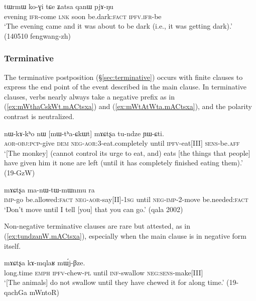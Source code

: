 \begin{exe}
\ex \label{ex:qanW.pjANu}
\gll  tɯrmɯ ko-ɣi tɕe ʑatsa qanɯ pjɤ-ŋu \\
evening \textsc{ifr}-come \textsc{lnk} soon be.dark:\textsc{fact} \textsc{ipfv}.\textsc{ifr}-be \\
\glt `The evening came and it was about to be dark (i.e., it was getting dark).' (140510 fengwang-zh)
\end{exe}

 \subsubsection{Terminative} \label{sec:terminative.clause}
The terminative postposition    (§\ref{sec:terminative}) occurs with finite clauses to express the end point of the event described in the main clause. In terminative clauses, verbs nearly always take a negative prefix as in (\ref{ex:mWthaCskWt.mACtsxa}) and (\ref{ex:mWtAtWta.mACtsxa}), and the polarity contrast is neutralized.

\begin{exe}
\ex \label{ex:mWthaCskWt.mACtsxa}
\gll nɯ-kɤ-kʰo nɯ [mɯ-tʰa-ɕkɯt] mɤɕtʂa tu-ndze ɲɯ-ɕti. \\
\textsc{aor}-\textsc{obj}:\textsc{pcp}-give \textsc{dem} \textsc{neg}-\textsc{aor}:3\flobv{}-eat.completely until \textsc{ipfv}-eat[III] \textsc{sens}-be.\textsc{aff} \\
\glt `[The monkey] (cannot control its urge to eat, and) eats [the things that people] have given him it none are left (until it has completely finished eating them).' (19-GzW)
\end{exe}

\begin{exe}
\ex \label{ex:mWtAtWta.mACtsxa}
 mɤɕtʂa ma-nɯ-tɯ-mɯnmu ra \\
\textsc{imp}-go be.allowed:\textsc{fact} \textsc{neg}-\textsc{aor}-say[II]-\textsc{1sg} until \textsc{neg}-\textsc{imp}-2-move be.needed:\textsc{fact} \\
\glt `Don't move until I tell [you] that you can go.' (qala 2002)
\end{exe}

Non-negative terminative clauses are rare but attested, as in (\ref{ex:tundzanW.mACtsxa}), especially when the main clause is in negative form itself.

\begin{exe}
\ex \label{ex:tundzanW.mACtsxa}
 mɤɕtʂa kɤ-mqlaʁ mɯ́j-βze. \\
long.time \textsc{emph} \textsc{ipfv}-chew-\textsc{pl} until \textsc{inf}-swallow \textsc{neg}:\textsc{sens}-make[III] \\
\glt `[The animals] do not swallow until they have chewed it for along time.' (19-qachGa mWntoR)
\end{exe}

